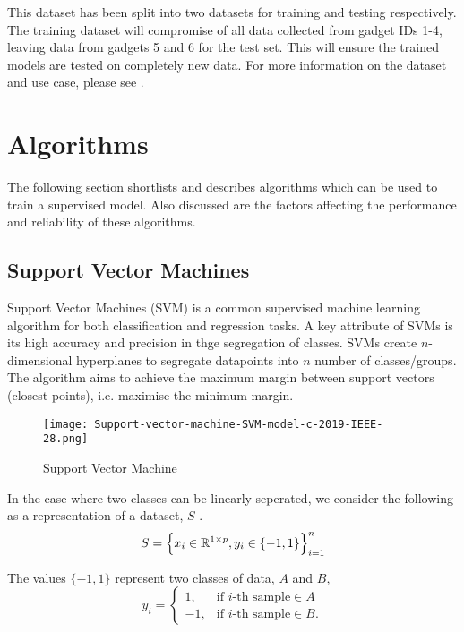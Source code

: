 
This dataset has been split into two datasets for training and testing respectively.
The training dataset will compromise of all data collected from gadget IDs 1-4, leaving data from gadgets 5 and 6 for the test set.
This will ensure the trained models are tested on completely new data. For more information on the dataset and use case, please see \cite{ahonen}.

\section{Algorithms}
The following section shortlists and describes algorithms which can be used to train a supervised model. 
Also discussed are the factors affecting the performance and reliability of these algorithms.

\subsection{Support Vector Machines}
Support Vector Machines (SVM) is a common supervised machine learning algorithm for both classification and regression tasks.
A key attribute of SVMs is its high accuracy and precision in thge segregation of classes.
SVMs create $n$-dimensional hyperplanes to segregate datapoints into $n$ number of classes/groups. 
The algorithm aims to achieve the maximum margin between support vectors (closest points), i.e. maximise the minimum margin.

\begin{figure}[h]
    \texttt{[image: Support-vector-machine-SVM-model-c-2019-IEEE-28.png]}
    \centering
    \caption{Support Vector Machine \cite{svm-pic}}
    \label{fig:SVM}
\end{figure}

In the case where two classes can be linearly seperated, we consider the following as a representation of a dataset, $S$ \cite{6653952} \cite{d163fd27cc414d1a806b3e2db0164bfc}.
\begin{equation}
    S = \Big\{x_i \in \mathbb{R}^{1 \times p}, y_i \in \{-1, 1\}\Big\}^n_{i=1}
\end{equation}

The values $\{-1, 1\}$ represent two classes of data, $A$ and $B$,
\begin{equation}
    y_i = \begin{cases}
        1, & \text{if $i$} \text{-th sample} \in  A\\
        -1, & \text{if $i$} \text{-th sample} \in  B.
    \end{cases}
\end{equation}

